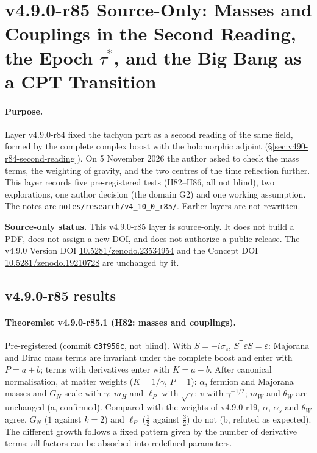 
\clearpage
\section*{v4.9.0-r85 Source-Only: Masses and Couplings in the Second Reading, the Epoch \texorpdfstring{\(\tau^*\)}{tau*}, and the Big Bang as a CPT Transition}
\label{sec:v490-r85-masses-cpt}

\paragraph{Purpose.}
Layer v4.9.0-r84 fixed the tachyon part as a second reading of the same field, formed by the complete complex boost with the
holomorphic adjoint (\S\ref{sec:v490-r84-second-reading}).  On 5 November 2026 the author asked to check the mass terms, the weighting
of gravity, and the two centres of the time reflection further.  This layer records five pre-registered tests (H82--H86, all not blind),
two explorations, one author decision (the domain G2) and one working assumption.  The notes are
\texttt{notes/\allowbreak research/\allowbreak v4\_10\_0\_r85/}.  Earlier layers are not rewritten.

\noindent\textbf{Source-only status.}
This v4.9.0-r85 layer is source-only.  It does not build a PDF, does not assign a new DOI,
and does not authorize a public release.  The v4.9.0 Version DOI
\href{https://doi.org/10.5281/zenodo.23534954}{10.5281/zenodo.23534954} and the Concept DOI
\href{https://doi.org/10.5281/zenodo.19210728}{10.5281/zenodo.19210728} are unchanged by it.

\subsection*{v4.9.0-r85 results}
\label{subsec:v490-r85-results}

\paragraph{Theoremlet v4.9.0-r85.1 (H82: masses and couplings).}
Pre-registered (commit \texttt{c3f956c}, not blind).  With \(S=-i\sigma_z\), \(S^{\mathsf T}\varepsilon S=\varepsilon\): Majorana and Dirac mass terms are
invariant under the complete boost and enter with \(P=a+b\); terms with derivatives enter with \(K=a-b\).  After canonical normalisation, at
matter weights (\(K=1/\gamma\), \(P=1\)): \(\alpha\), fermion and Majorana masses and \(G_N\) scale with \(\gamma\); \(m_H\) and \(\ell_P\) with
\(\sqrt\gamma\); \(v\) with \(\gamma^{-1/2}\); \(m_W\) and \(\theta_W\) are unchanged (a, confirmed).  Compared with the weights of v4.9.0-r19, \(\alpha\),
\(\alpha_s\) and \(\theta_W\) agree, \(G_N\) (\(1\) against \(k=2\)) and \(\ell_P\) (\(\tfrac12\) against \(\tfrac32\)) do not (b, refuted as expected).  The
different growth follows a fixed pattern given by the number of derivative terms; all factors can be absorbed into redefined parameters.

